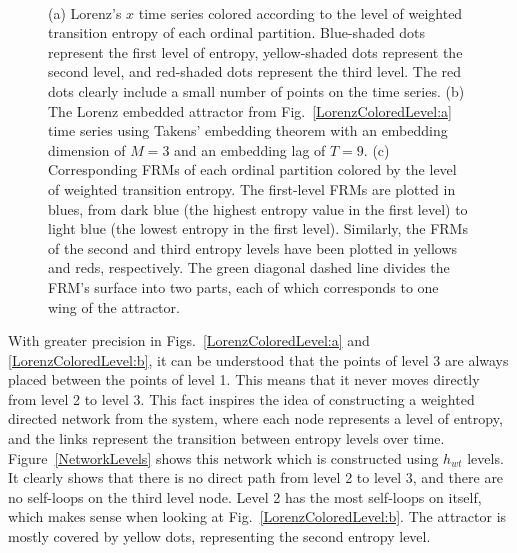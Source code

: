 \documentclass[%
 aip,
 amsmath,amssymb,
 reprint,%
]{revtex4-1}
\begin{document}
\begin{figure}[htbp]
{        \label{LorenzColoredLevel:c}}\\[-1pt]
    \caption{(a) Lorenz's $x$ time series colored according to the level of weighted transition entropy of each ordinal partition. Blue-shaded dots represent the first level of entropy, yellow-shaded dots represent the second level, and red-shaded dots represent the third level. The red dots clearly include a small number of points on the time series. (b)  The Lorenz embedded attractor from Fig.~\ref{LorenzColoredLevel:a} time series using Takens' embedding theorem with an embedding dimension of $M=3$ and an embedding lag of $T = 9$. (c) Corresponding FRMs of each ordinal partition colored by the level of weighted transition entropy. The first-level FRMs are plotted in blues, from dark blue (the highest entropy value in the first level) to light blue (the lowest entropy in the first level). Similarly, the FRMs of the second and third entropy levels have been plotted in yellows and reds, respectively. The green diagonal dashed line divides the FRM's surface into two parts, each of which corresponds to one wing of the attractor.}
    \label{LorenzColoredLevel}
\end{figure}

With greater precision in Figs.~\ref{LorenzColoredLevel:a} and \ref{LorenzColoredLevel:b}, it can be understood that the points of level 3 are always placed between the points of level 1. This means that it never moves directly from level 2 to level 3. This fact inspires the idea of constructing a weighted directed network from the system, where each node represents a level of entropy, and the links represent the transition between entropy levels over time. Figure~\ref{NetworkLevels} shows this network which is constructed using $h_{wt}$ levels. It clearly shows that there is no direct path from level 2 to level 3, and there are no self-loops on the third level node. Level 2 has the most self-loops on itself, which makes sense when looking at Fig.~\ref{LorenzColoredLevel:b}. The attractor is mostly covered by yellow dots, representing the second entropy level.
\end{document}
